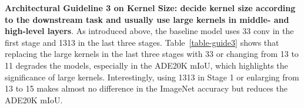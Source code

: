 \documentclass[10pt,twocolumn,letterpaper]{article}
\begin{document}
	\begin{table}
		\caption{Models with different forms of Structural Re-parameterization on the 1313 conv layers.}
		\label{table-reparam}
		\vspace{-0.2in}
		\begin{center}
		\end{center}
		\vspace{-0.2in}
	\end{table}

\noindent\textbf{Architectural Guideline 3 on Kernel Size: decide kernel size according to the downstream task and usually use large kernels in middle- and high-level layers}. As introduced above, the baseline model uses 33 conv in the first stage and 1313 in the last three stages. Table~\ref{table-guide3} shows that replacing the large kernels in the last three stages with 33 or changing  from 13 to 11 degrades the models, especially in the ADE20K mIoU, which highlights the significance of large kernels. Interestingly, using 1313 in Stage 1 or enlarging  from 13 to 15 makes almost no difference in the ImageNet accuracy but reduces the ADE20K mIoU.
\end{document}

